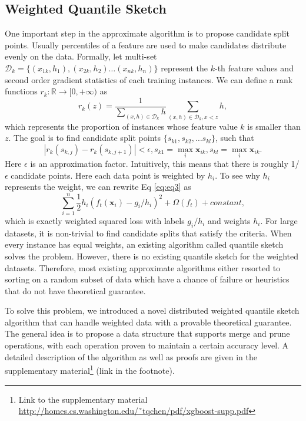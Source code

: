 \documentclass[sigconf]{acmart}
\begin{document}
\subsection{Weighted Quantile Sketch}
\label{subsec:Weighted Quantile Sketch}
One important step in the approximate algorithm is to propose candidate split points. Usually percentiles of a feature 
are used to make candidates distribute evenly on the data.
Formally, let multi-set $\mathcal{D}_k = \{(x_{1k}, h_1),(x_{2k}, h_2)\dots (x_{nk}, h_n)\}$
represent the $k$-th feature values and second order gradient statistics of each training instances. We can define a rank
functions $r_k : \mathbb{R} \to [0, +\infty)$ as
\begin{equation}
    r_k(z) = \frac{1}{\sum_{(x,h) \in \mathcal{D}_k}h} \sum_{(x,h)\in \mathcal{D}_k,x<z}h,
    \label{eq:eq8}
\end{equation}
which represents the proportion of instances whose feature value $k$ is smaller than $z$. The goal is to find candidate 
split points $\{s_{k1}, s_{k2}, \dots s_{kl}\}$, such that
\begin{equation}
    |r_k(s_{k,j}) - r_k(s_{k,j+1})| < \epsilon,  s_{k1} = \max_i \mathbf{x}_{ik},s_{kl} = \max_i \mathbf{x}_{ik}.
    \label{eq:eq9}
\end{equation}
Here $\epsilon$ is an approximation factor. Intuitively, this means that there is roughly 1/$\epsilon$ candidate points. 
Here each data point is weighted by $h_i$. To see why $h_i$ represents the weight, we can rewrite Eq \eqref{eq:eq3} as
\begin{equation*}
    \sum_{i=1}^{n} \frac{1}{2}h_i(f_t(\mathbf{x}_i) - g_i/h_i)^2 + \Omega(f_t) + constant,
\end{equation*}
which is exactly weighted squared loss with labels $g_i/h_i$ and weights $h_i$. For large datasets, it is non-trivial to 
find candidate splits that satisfy the criteria. When every instance has equal weights, an existing algorithm called 
quantile sketch \cite{greenwald2001space,zhang2007fast} solves the problem. However, there is no existing quantile sketch for the weighted datasets. 
Therefore, most existing approximate algorithms either resorted to sorting on a random subset of data which have a chance of
failure or heuristics that do not have theoretical guarantee.

To solve this problem, we introduced a novel distributed weighted quantile sketch algorithm that can handle weighted
data with a provable theoretical guarantee. The general idea is to propose a data structure that supports merge and prune
operations, with each operation proven to maintain a certain accuracy level. A detailed description of the algorithm as
well as proofs are given in the supplementary material\footnote{Link to the supplementary material \\
\url{http://homes.cs.washington.edu/˜tqchen/pdf/xgboost-supp.pdf}} (link in the footnote).
\end{document}
